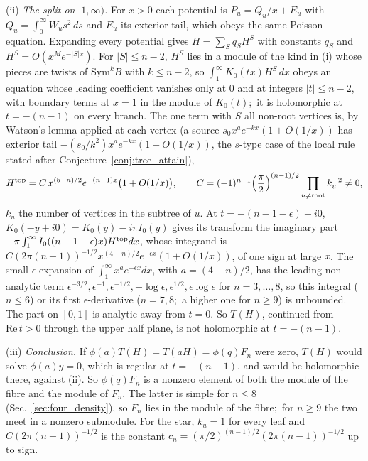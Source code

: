 \documentclass[aps,pra,twocolumn,superscriptaddress,longbibliography]{revtex4-2}
\begin{document}
(ii) \emph{The split on $[1,\infty)$.}  For $x>0$ each potential is
$P_u=Q_u/x+E_u$ with $Q_u=\int_0^\infty W_us^2\,ds$ and $E_u$ its exterior
tail, which obeys the same Poisson equation.  Expanding every potential gives
$H=\sum_Sq_SH^S$ with constants $q_S$ and $H^S=O(x^Me^{-|S|x})$.  For
$|S|\le n-2$, $H^S$ lies in a module of the kind in (i) whose pieces are twists
of $\mathrm{Sym}^kB$ with $k\le n-2$, so $\int_1^\infty K_0(tx)H^S\,dx$ obeys an
equation whose leading coefficient vanishes only at $0$ and at integers
$|t|\le n-2$, with boundary terms at $x=1$ in the module of $K_0(t)$;\ it is
holomorphic at $t=-(n-1)$ on every branch.  The one term with $S$ all
non-root vertices is, by Watson's lemma applied at each vertex (a source
$s_0x^ae^{-kx}(1+O(1/x))$ has exterior tail $-(s_0/k^2)x^ae^{-kx}(1+O(1/x))$, the
$s$-type case of the local rule stated after Conjecture~\ref{conj:tree_attain}),
\begin{equation*}
H^{\rm top}=C\,x^{(5-n)/2}e^{-(n-1)x}\bigl(1+O(1/x)\bigr),\qquad
C=(-1)^{n-1}\Bigl(\frac{\pi}{2}\Bigr)^{(n-1)/2}\prod_{u\neq{\rm root}}k_u^{-2}\neq0,
\end{equation*}
$k_u$ the number of vertices in the subtree of $u$.  At $t=-(n-1-\epsilon)+i0$,
$K_0(-y+i0)=K_0(y)-i\pi I_0(y)$ gives its transform the imaginary part
$-\pi\int_1^\infty I_0((n-1-\epsilon)x)H^{\rm top}dx$, whose integrand is
$C(2\pi(n-1))^{-1/2}x^{(4-n)/2}e^{-\epsilon x}(1+O(1/x))$, of one sign at large
$x$.  The small-$\epsilon$ expansion of $\int_1^\infty x^ae^{-\epsilon x}dx$, with
$a=(4-n)/2$, has the leading non-analytic term
$\epsilon^{-3/2},\epsilon^{-1},\epsilon^{-1/2},-\log\epsilon,\epsilon^{1/2},
\epsilon\log\epsilon$ for $n=3,\dots,8$, so this integral ($n\le6$) or its first
$\epsilon$-derivative ($n=7,8$;\ a higher one for $n\ge9$) is unbounded.  The part on $[0,1]$ is analytic
away from $t=0$.  So $T(H)$, continued from $\mathrm{Re}\,t>0$ through the
upper half plane, is not holomorphic at $t=-(n-1)$.

(iii) \emph{Conclusion.}  If $\phi(a)T(H)=T(aH)=\phi(q)F_n$ were zero, $T(H)$
would solve $\phi(a)y=0$, which is regular at $t=-(n-1)$, and would be
holomorphic there, against (ii).  So $\phi(q)F_n$ is a nonzero element of both
the module of the fibre and the module of $F_n$.  The latter is simple for
$n\le8$ (Sec.~\ref{sec:four_density}), so $F_n$ lies in the module of the
fibre;\ for $n\ge9$ the two meet in a nonzero submodule.  For the star,
$k_u=1$ for every leaf and $C(2\pi(n-1))^{-1/2}$ is the constant
$c_n=(\pi/2)^{(n-1)/2}(2\pi(n-1))^{-1/2}$ up to sign.
\end{document}

